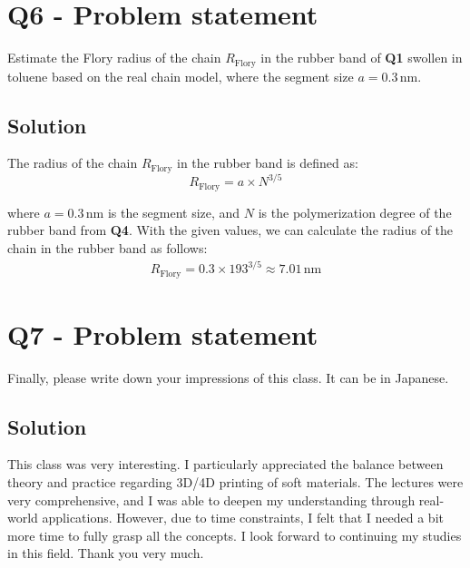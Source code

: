 \documentclass{article}
\begin{document}
\section*{Q6 - Problem statement}
Estimate the Flory radius of the chain \( R_{\text{Flory}} \) in the rubber band of \textbf{Q1} swollen in toluene based on the real chain model, where the segment size \( a = 0.3 \, \text{nm} \).
\subsection*{Solution}
The radius of the chain \( R_{\text{Flory}} \) in the rubber band is defined as:
\begin{equation}
  R_{\text{Flory}} = a \times N^{3/5}
\end{equation}

where \( a = 0.3 \, \text{nm} \) is the segment size, and \( N \) is the polymerization degree of the rubber band from \textbf{Q4}.
With the given values, we can calculate the radius of the chain in the rubber band as follows:
\begin{equation}
  \begin{gathered}
  R_{\text{Flory}} = 0.3 \times 193^{3/5} \approx 7.01 \, \text{nm}
  \end{gathered}
\end{equation}

\section*{Q7 - Problem statement}
Finally, please write down your impressions of this class. It can be in Japanese. 
\subsection*{Solution}
This class was very interesting. I particularly appreciated the balance between theory and practice regarding 3D/4D printing of soft materials. The lectures were very comprehensive, and I was able to deepen my understanding through real-world applications. However, due to time constraints, I felt that I needed a bit more time to fully grasp all the concepts. I look forward to continuing my studies in this field. Thank you very much.
\end{document}
